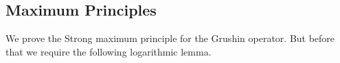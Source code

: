 \documentclass[11pt]{article}
\newcommand{\lv}{\lVert}
\newcommand{\rv}{\rVert}
\newcommand{\gradgr}{\nabla_{\gamma}}
\newcommand{\spacegr}{H^{1}_{0,\gamma}(\Omega)}
\begin{document}







\subsection{Maximum Principles}

We prove the Strong maximum principle for the Grushin operator. But before that we require the following logarithmic lemma.
\end{document}

